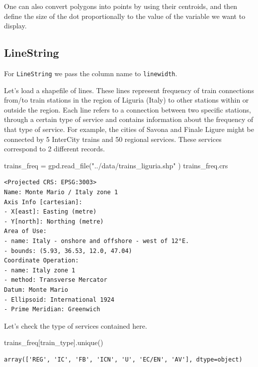 \documentclass[
  letterpaper,
  DIV=11,
  numbers=noendperiod]{scrreprt}
\newenvironment{Shaded}{\begin{snugshade}}{\end{snugshade}}
\newcommand{\NormalTok}[1]{\textcolor[rgb]{0.00,0.23,0.31}{#1}}
\newcommand{\OperatorTok}[1]{\textcolor[rgb]{0.37,0.37,0.37}{#1}}
\newcommand{\StringTok}[1]{\textcolor[rgb]{0.13,0.47,0.30}{#1}}
\begin{document}
One can also convert polygons into points by using their centroids, and
then define the size of the dot proportionally to the value of the
variable we want to display.

\subsection{LineString}\label{linestring}

For \texttt{LineString} we pass the column name to \texttt{linewidth}.

Let's load a shapefile of lines. These lines represent frequency of
train connections from/to train stations in the region of Liguria
(Italy) to other stations within or outside the region. Each line refers
to a connection between two specific stations, through a certain type of
service and contains information about the frequency of that type of
service. For example, the cities of Savona and Finale Ligure might be
connected by 5 InterCity trains and 50 regional services. These services
correspond to 2 different records.

\begin{Shaded}
\begin{Highlighting}[]
\NormalTok{trains\_freq }\OperatorTok{=}\NormalTok{ gpd.read\_file(}\StringTok{"../data/trains\_liguria.shp"}\NormalTok{ )}
\NormalTok{trains\_freq.crs}
\end{Highlighting}
\end{Shaded}

\begin{verbatim}
<Projected CRS: EPSG:3003>
Name: Monte Mario / Italy zone 1
Axis Info [cartesian]:
- X[east]: Easting (metre)
- Y[north]: Northing (metre)
Area of Use:
- name: Italy - onshore and offshore - west of 12°E.
- bounds: (5.93, 36.53, 12.0, 47.04)
Coordinate Operation:
- name: Italy zone 1
- method: Transverse Mercator
Datum: Monte Mario
- Ellipsoid: International 1924
- Prime Meridian: Greenwich
\end{verbatim}

Let's check the type of services contained here.

\begin{Shaded}
\begin{Highlighting}[]
\NormalTok{trains\_freq[}\StringTok{\textquotesingle{}train\_type\textquotesingle{}}\NormalTok{].unique()}
\end{Highlighting}
\end{Shaded}

\begin{verbatim}
array(['REG', 'IC', 'FB', 'ICN', 'U', 'EC/EN', 'AV'], dtype=object)
\end{verbatim}
\end{document}
